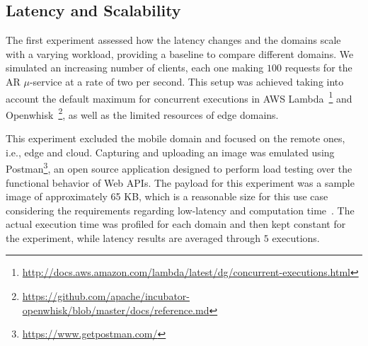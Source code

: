 \subsection{Latency and Scalability} 



The first experiment assessed how the latency changes and the domains scale with a varying workload, providing a baseline to compare different domains. We simulated an increasing number of clients, each one making $100$ requests for the AR $\mu$-service at a rate of two per second. This setup was achieved taking into account the default maximum for concurrent executions in AWS Lambda~\footnote{\url{http://docs.aws.amazon.com/lambda/latest/dg/concurrent-executions.html}} and Openwhisk~\footnote{\url{https://github.com/apache/incubator-openwhisk/blob/master/docs/reference.md}}, as well as the limited resources of edge domains. 

This experiment excluded the mobile domain and focused on the remote ones, i.e., edge and cloud. Capturing and uploading an image was emulated using Postman\footnote{\url{https://www.getpostman.com/}}, an open source application designed to perform load testing over the functional behavior of Web APIs. The payload for this experiment was a sample image of approximately 65 KB, which is a reasonable size for this use case considering the requirements regarding low-latency and computation time~\cite{rodriguez16mobile}. The actual execution time was profiled for each domain and then kept constant for the experiment, while latency results are averaged through $5$ executions.



